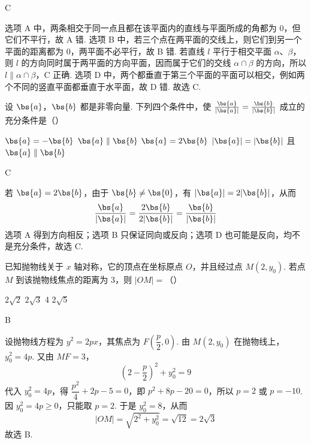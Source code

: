 \begin{answer}
C
\end{answer}

\begin{solution}
选项 A 中，两条相交于同一点且都在该平面内的直线与平面所成的角都为 \(0\)，但它们不平行，故 A 错.
选项 B 中，若三个点在两平面的交线上，则它们到另一个平面的距离都为 \(0\)，两平面不必平行，故 B 错.
若直线 \(l\) 平行于相交平面 \(\alpha\)、\(\beta\)，则 \(l\) 的方向同时属于两平面的方向平面，因而属于它们的交线 \(\alpha\cap\beta\) 的方向，所以 \(l\parallel\alpha\cap\beta\)，C 正确.
选项 D 中，两个都垂直于第三个平面的平面可以相交，例如两个不同的竖直平面都垂直于水平面，故 D 错. 故选 C.
\end{solution}

\begin{problem}
设 \(\bs{a}\)，\(\bs{b}\) 都是非零向量. 下列四个条件中，使 \(\frac{\bs{a}}{|\bs{a}|} = \frac{\bs{b}}{|\bs{b}|}\) 成立的充分条件是（\quad）

\choices
    {\(\bs{a} = -\bs{b}\)}
    {\(\bs{a} \parallel \bs{b}\)}
    {\(\bs{a} = 2\bs{b}\)}
    {\(|\bs{a}| = |\bs{b}|\) 且 \(\bs{a} \parallel \bs{b}\)}
\end{problem}

\begin{answer}
C
\end{answer}

\begin{solution}
若 \(\bs{a}=2\bs{b}\)，由于 \(\bs{b}\neq\bs{0}\)，有 \(|\bs{a}|=2|\bs{b}|\)，从而
\[
\frac{\bs{a}}{|\bs{a}|}=\frac{2\bs{b}}{2|\bs{b}|}=\frac{\bs{b}}{|\bs{b}|}
\]
选项 A 得到方向相反；选项 B 只保证同向或反向；选项 D 也可能是反向，均不是充分条件，故选 C.
\end{solution}

\begin{problem}
已知抛物线关于 \(x\) 轴对称，它的顶点在坐标原点 \(O\)，并且经过点 \(M(2, y_0)\). 若点 \(M\) 到该抛物线焦点的距离为 3，则 \(|OM|=\)（\quad）

\choices
    {\(2\sqrt{2}\)}
    {\(2\sqrt{3}\)}
    {4}
    {\(2\sqrt{5}\)}
\end{problem}

\begin{answer}
B
\end{answer}

\begin{solution}
设抛物线方程为 \(y^2=2px\)，其焦点为 \(F\left(\dfrac p2,0\right)\). 由 \(M(2,y_0)\) 在抛物线上，
\(y_0^2=4p\). 又由 \(MF=3\)，
\[
\left(2-\frac p2\right)^2+y_0^2=9
\]
代入 \(y_0^2=4p\)，得 \(\dfrac{p^2}{4}+2p-5=0\)，即
\(p^2+8p-20=0\)，所以 \(p=2\) 或 \(p=-10\). 因 \(y_0^2=4p\geqslant0\)，只能取 \(p=2\). 于是 \(y_0^2=8\)，从而
\[
|OM|=\sqrt{2^2+y_0^2}=\sqrt{12}=2\sqrt{3}
\]
故选 B.
\end{solution}

